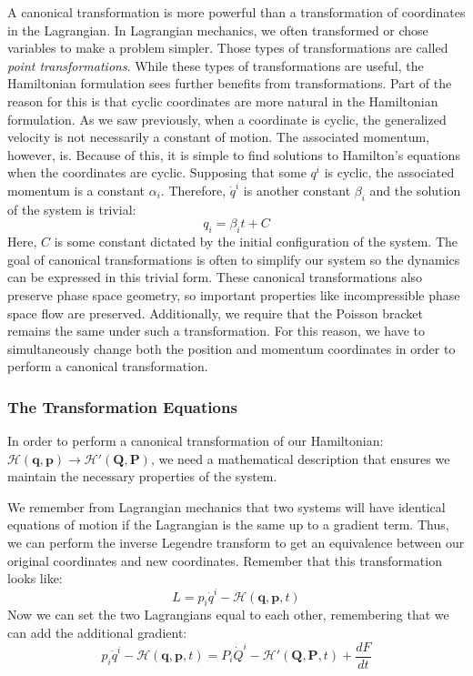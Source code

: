 A canonical transformation is more powerful than a transformation of coordinates in the \gls{Lagrangian}. In \gls{Lagrangian} mechanics, we often transformed or chose variables to make a problem simpler. Those types of transformations are called \textit{point transformations}. While these types of transformations are useful, the \gls{Hamiltonian} formulation sees further benefits from transformations. Part of the reason for this is that cyclic coordinates are more natural in the \gls{Hamiltonian} formulation. As we saw previously, when a coordinate is cyclic, the generalized velocity is not necessarily a constant of motion. The associated momentum, however, is. Because of this, it is simple to find solutions to Hamilton's equations when the coordinates are cyclic. Supposing that some $q^i$ is cyclic, the associated momentum is a constant $\alpha_i$. Therefore, $\dot{q}^i$ is another constant $\beta_i$ and the solution of the system is trivial:
$$q_i=\beta_it+C$$
Here, $C$ is some constant dictated by the initial configuration of the system. The goal of canonical transformations is often to simplify our system so the dynamics can be expressed in this trivial form. These canonical transformations also preserve phase space geometry, so important properties like incompressible phase space flow are preserved. Additionally, we require that the Poisson bracket remains the same under such a transformation. For this reason, we have to simultaneously change both the position and momentum coordinates in order to perform a canonical transformation.

\subsubsection{The Transformation Equations}
In order to perform a canonical transformation of our \gls{Hamiltonian}: $\mathcal{H}(\bm{q},\bm{p})\rightarrow\mathcal{H}'(\bm{Q},\bm{P})$, we need a mathematical description that ensures we maintain the necessary properties of the system. 

We remember from \gls{Lagrangian} mechanics that two systems will have identical equations of motion if the \gls{Lagrangian} is the same up to a gradient term. Thus, we can perform the inverse Legendre transform to get an equivalence between our original coordinates and new coordinates. Remember that this transformation looks like:
$$L=p_i\dot{q}^i-\mathcal{H}(\bm{q},\bm{p},t)$$
Now we can set the two \glspl{Lagrangian} equal to each other, remembering that we can add the additional gradient:
\begin{equation}\label{eq:canonical transform}
p_i\dot{q}^i-\mathcal{H}(\bm{q},\bm{p},t)=P_i\dot{Q}^i-\mathcal{H}'(\bm{Q},\bm{P},t)+\frac{dF}{dt}
\end{equation}

